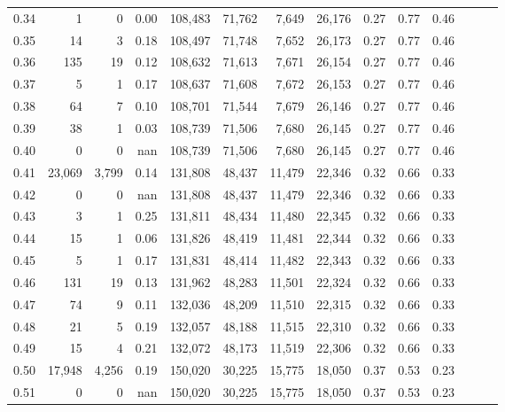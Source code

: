 \begin{tabular}{rrrrrrrrrrrrrr}
0.34 &       1 &      0 &  0.00 &  108,483 &   71,762 &   7,649 &  26,176 &  0.27 &  0.77 &      0.46 \\
0.35 &      14 &      3 &  0.18 &  108,497 &   71,748 &   7,652 &  26,173 &  0.27 &  0.77 &      0.46 \\
0.36 &     135 &     19 &  0.12 &  108,632 &   71,613 &   7,671 &  26,154 &  0.27 &  0.77 &      0.46 \\
0.37 &       5 &      1 &  0.17 &  108,637 &   71,608 &   7,672 &  26,153 &  0.27 &  0.77 &      0.46 \\
0.38 &      64 &      7 &  0.10 &  108,701 &   71,544 &   7,679 &  26,146 &  0.27 &  0.77 &      0.46 \\
0.39 &      38 &      1 &  0.03 &  108,739 &   71,506 &   7,680 &  26,145 &  0.27 &  0.77 &      0.46 \\
0.40 &       0 &      0 &   nan &  108,739 &   71,506 &   7,680 &  26,145 &  0.27 &  0.77 &      0.46 \\
0.41 &  23,069 &  3,799 &  0.14 &  131,808 &   48,437 &  11,479 &  22,346 &  0.32 &  0.66 &      0.33 \\
0.42 &       0 &      0 &   nan &  131,808 &   48,437 &  11,479 &  22,346 &  0.32 &  0.66 &      0.33 \\
0.43 &       3 &      1 &  0.25 &  131,811 &   48,434 &  11,480 &  22,345 &  0.32 &  0.66 &      0.33 \\
0.44 &      15 &      1 &  0.06 &  131,826 &   48,419 &  11,481 &  22,344 &  0.32 &  0.66 &      0.33 \\
0.45 &       5 &      1 &  0.17 &  131,831 &   48,414 &  11,482 &  22,343 &  0.32 &  0.66 &      0.33 \\
0.46 &     131 &     19 &  0.13 &  131,962 &   48,283 &  11,501 &  22,324 &  0.32 &  0.66 &      0.33 \\
0.47 &      74 &      9 &  0.11 &  132,036 &   48,209 &  11,510 &  22,315 &  0.32 &  0.66 &      0.33 \\
0.48 &      21 &      5 &  0.19 &  132,057 &   48,188 &  11,515 &  22,310 &  0.32 &  0.66 &      0.33 \\
0.49 &      15 &      4 &  0.21 &  132,072 &   48,173 &  11,519 &  22,306 &  0.32 &  0.66 &      0.33 \\
0.50 &  17,948 &  4,256 &  0.19 &  150,020 &   30,225 &  15,775 &  18,050 &  0.37 &  0.53 &      0.23 \\
0.51 &       0 &      0 &   nan &  150,020 &   30,225 &  15,775 &  18,050 &  0.37 &  0.53 &      0.23 \\

\end{tabular}
